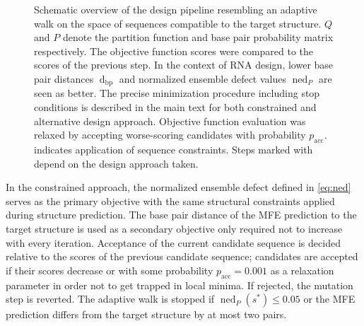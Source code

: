 \documentclass[../../master.tex]{subfiles}
\begin{document}
\begin{figure}[!ht]
	\caption[Schematic of the Design Pipeline]{
		Schematic overview of the design pipeline resembling an adaptive walk on the space of sequences compatible to the target structure.
		$Q$ and $P$ denote the partition function and base pair probability matrix respectively.
		The objective function scores were compared to the scores of the previous step. 
		In the context of RNA design, lower base pair distances $\operatorname{d}_\mathrm{bp}$ and normalized ensemble defect values $\operatorname{ned}_P$ are seen as better.
		The precise minimization procedure including stop conditions is described in the main text for both constrained and alternative design approach.
		Objective function evaluation was relaxed by accepting  worse-scoring candidates with probability $p_\mathrm{acc}$.
		\faChain\, indicates application of sequence constraints.
		Steps marked with \approachsymbol depend on the design approach taken.
	}\label{fig:pipelineoverview}
\end{figure}
\newpage
In the constrained approach, the normalized ensemble defect defined in \autoref{eq:ned} serves as the primary objective with the same structural constraints applied during structure prediction.
The base pair distance of the MFE prediction to the target structure is used as a secondary objective only required not to increase with every iteration.
Acceptance of the current candidate sequence is decided relative to the scores of the previous candidate sequence; candidates are accepted if their scores decrease or with some probability $p_\mathrm{acc} = 0.001$ as a relaxation parameter in order not to get trapped in local minima.
If rejected, the mutation step is reverted.
The adaptive walk is stopped if $\operatorname{ned}_P(s^*) \leq 0.05$ or the MFE prediction differs from the target structure by at most two pairs.
\end{document}
